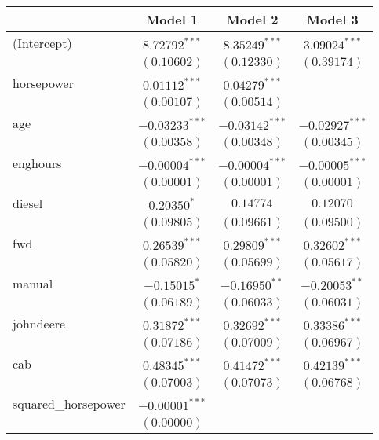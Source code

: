 
\begin{table}
\begin{center}
\begin{tabular}{l c c c}
\hline
 & Model 1 & Model 2 & Model 3 \\
\hline
(Intercept)         & $8.72792^{***}$  & $8.35249^{***}$  & $3.09024^{***}$  \\
                    & $(0.10602)$      & $(0.12330)$      & $(0.39174)$      \\
horsepower          & $0.01112^{***}$  & $0.04279^{***}$  &                  \\
                    & $(0.00107)$      & $(0.00514)$      &                  \\
age                 & $-0.03233^{***}$ & $-0.03142^{***}$ & $-0.02927^{***}$ \\
                    & $(0.00358)$      & $(0.00348)$      & $(0.00345)$      \\
enghours            & $-0.00004^{***}$ & $-0.00004^{***}$ & $-0.00005^{***}$ \\
                    & $(0.00001)$      & $(0.00001)$      & $(0.00001)$      \\
diesel              & $0.20350^{*}$    & $0.14774$        & $0.12070$        \\
                    & $(0.09805)$      & $(0.09661)$      & $(0.09500)$      \\
fwd                 & $0.26539^{***}$  & $0.29809^{***}$  & $0.32602^{***}$  \\
                    & $(0.05820)$      & $(0.05699)$      & $(0.05617)$      \\
manual              & $-0.15015^{*}$   & $-0.16950^{**}$  & $-0.20053^{**}$  \\
                    & $(0.06189)$      & $(0.06033)$      & $(0.06031)$      \\
johndeere           & $0.31872^{***}$  & $0.32692^{***}$  & $0.33386^{***}$  \\
                    & $(0.07186)$      & $(0.07009)$      & $(0.06967)$      \\
cab                 & $0.48345^{***}$  & $0.41472^{***}$  & $0.42139^{***}$  \\
                    & $(0.07003)$      & $(0.07073)$      & $(0.06768)$      \\
squared\_horsepower & $-0.00001^{***}$ &                  &                  \\
                    & $(0.00000)$      &                  &                  \\

\end{tabular}
\end{center}
\end{table}
